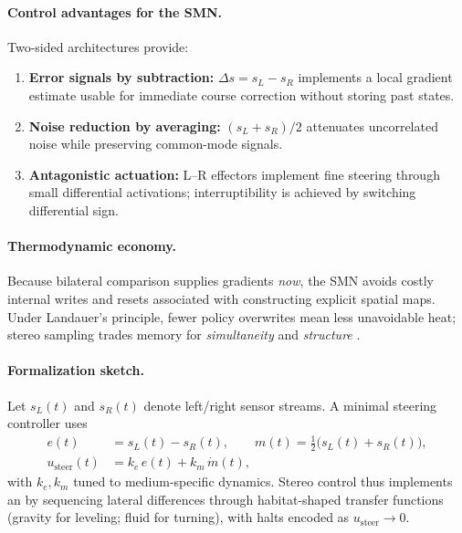 \paragraph{Control advantages for the SMN.}
Two-sided architectures provide:
\begin{enumerate}
  \item \textbf{Error signals by subtraction:} $\Delta s = s_L - s_R$ implements a local gradient estimate usable for immediate course correction without storing past states.
  \item \textbf{Noise reduction by averaging:} $(s_L+s_R)/2$ attenuates uncorrelated noise while preserving common-mode signals.
  \item \textbf{Antagonistic actuation:} L--R effectors implement fine steering through small differential activations; interruptibility is achieved by switching differential sign.
\end{enumerate}

\paragraph{Thermodynamic economy.}
Because bilateral comparison supplies gradients \emph{now}, the SMN avoids costly internal writes and resets associated with constructing explicit spatial maps.
Under Landauer's principle, fewer policy overwrites mean less unavoidable heat; stereo sampling trades memory for \emph{simultaneity} and \emph{structure} \cite{Landauer1961Irreversibility,Bennett2003LandauerNotes,StillEtAl2012ThermoPrediction}.

\paragraph{Formalization sketch.}
Let $s_L(t)$ and $s_R(t)$ denote left/right sensor streams.
A minimal steering controller uses
\begin{align}
e(t) &= s_L(t) - s_R(t), \qquad m(t) = \tfrac{1}{2}\big(s_L(t)+s_R(t)\big), \\
u_{\text{steer}}(t) &= k_e\, e(t) + k_m\, \dot{m}(t),
\end{align}
with $k_e,k_m$ tuned to medium-specific dynamics.
Stereo control thus implements an \OAP{} by sequencing lateral differences through habitat-shaped transfer functions (gravity for leveling; fluid for turning), with halts encoded as $u_{\text{steer}} \to 0$.


